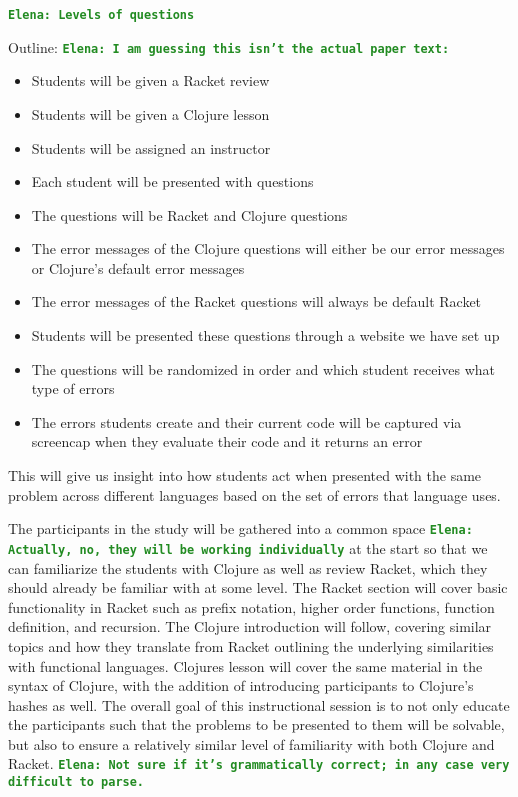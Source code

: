 \documentclass[12pt]{article}
\newcommand{\comment}[1]{{\bf \tt  {#1}}}
\newcommand{\emcomment}[1]{\textcolor{ForestGreen}{\comment{Elena: {#1}}}}
\begin{document}
\emcomment{Levels of questions}

Outline: \emcomment{I am guessing this isn't the actual paper text:}
\begin{itemize}
\item Students will be given a Racket review
\item Students will be given a Clojure lesson
\item Students will be assigned an instructor
\item Each student will be presented with questions
\item The questions will be Racket and Clojure questions
\item The error messages of the Clojure questions will either be our error messages or Clojure's default error messages
\item The error messages of the Racket questions will always be default Racket
\item Students will be presented these questions through a website we have set up
\item The questions will be randomized in order and which student receives what type of errors
\item The errors students create and their current code will be captured via screencap when they evaluate their code and it returns an error
\end{itemize}
This will give us insight into how students act when presented with the same problem across different languages based on the set of errors that language uses.


	The participants in the study will be gathered into a common space \emcomment{Actually, no, they will be working individually} at the start so that we can familiarize the students with Clojure as well as review Racket, which they should already be familiar with at some level. The Racket section will cover basic functionality in Racket such as prefix notation, higher order functions, function definition, and recursion. The Clojure introduction will follow, covering similar topics and how they translate from Racket outlining the underlying similarities with functional languages. Clojures lesson will cover the same material in the syntax of Clojure, with the addition of introducing participants to Clojure's hashes as well. The overall goal of this instructional session is to not only educate the participants such that the problems to be presented to them will be solvable, but also to ensure a relatively similar level of familiarity with both Clojure and Racket. \emcomment{Not sure if it's grammatically correct; in any case very difficult to parse.}
\end{document}
